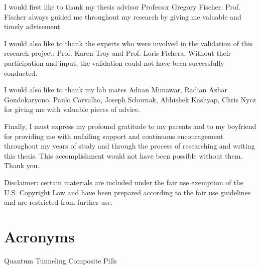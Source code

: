\begin{frontmatter}
\begin{abstract}
	\end{abstract}
	
	\begin{acknowledgment}
I would first like to thank my thesis advisor Professor Gregory Fischer. 
Prof. Fischer always guided me throughout my research by giving me valuable and timely advisement.

I would also like to thank the experts who were involved in the validation of this research project: Prof. Karen Troy and Prof. Loris Fichera. Without their participation and input, the validation could not have been successfully conducted.

I would also like to thank my lab mates Adnan Munawar, Radian Azhar Gondokaryono, Paulo Carvalho, Joseph Schornak, Abhishek Kashyap, Chris Nycz for giving me with valuable pieces of advice.

Finally, I must express my profound gratitude to my parents and to my boyfriend for providing me with unfailing support and continuous encouragement throughout my years of study and through the process of researching and writing this thesis. This accomplishment would not have been possible without them. Thank you.
	\end{acknowledgment}
	
	\tableofcontents
	
	\listoftables
	
	\listoffigures
	
	Disclaimer: certain materials are included under the fair use exemption of the U.S. Copyright Law and have been prepared according to the fair use guidelines and are restricted from further use.
	
	\pagebreak
	\section*{Acronyms}
	\begin{acronym}
	 {Quantum Tunneling Composite Pills}
	\end{acronym}
	
	\end{frontmatter}
	
	